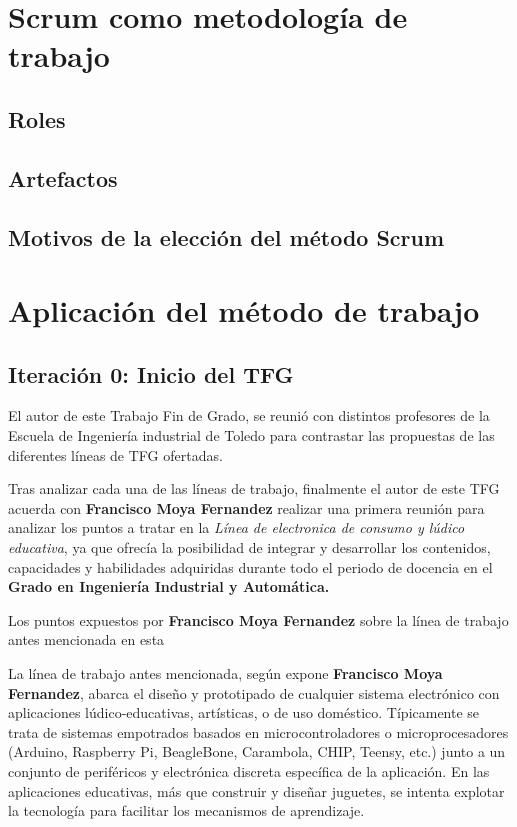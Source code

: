 \section{Scrum como metodología de trabajo}



\subsection{Roles}



\subsection{Artefactos}



\subsection{Motivos de la elección del método Scrum}



\section{Aplicación del método de trabajo}

\subsection{Iteración 0: Inicio del TFG}
El autor de este Trabajo Fin de Grado, se reunió con distintos profesores de la Escuela de Ingeniería industrial de Toledo para contrastar las propuestas de las diferentes líneas de TFG ofertadas.

Tras analizar cada una de las líneas de trabajo, finalmente el autor de este TFG acuerda con \textbf{Francisco Moya Fernandez} realizar una primera reunión para analizar los puntos a tratar en la \textit{Línea de electronica de consumo y lúdico educativa}, ya que ofrecía la posibilidad de integrar y desarrollar los contenidos, capacidades y habilidades adquiridas durante todo el periodo de docencia en el \textbf{Grado en Ingeniería Industrial y Automática.}

Los puntos expuestos por \textbf{Francisco Moya Fernandez} sobre la línea de trabajo antes mencionada en esta 

La línea de trabajo antes mencionada, según expone \textbf{Francisco Moya Fernandez}, abarca el diseño y prototipado de cualquier sistema electrónico con aplicaciones lúdico-educativas, artísticas, o de uso doméstico. Típicamente se trata de sistemas empotrados basados en microcontroladores o microprocesadores (Arduino, Raspberry Pi, BeagleBone, Carambola, CHIP, Teensy, etc.) junto a un conjunto de periféricos y electrónica discreta específica de la aplicación. En las aplicaciones educativas, más que construir y diseñar juguetes, se intenta explotar la tecnología para facilitar los mecanismos de aprendizaje.

